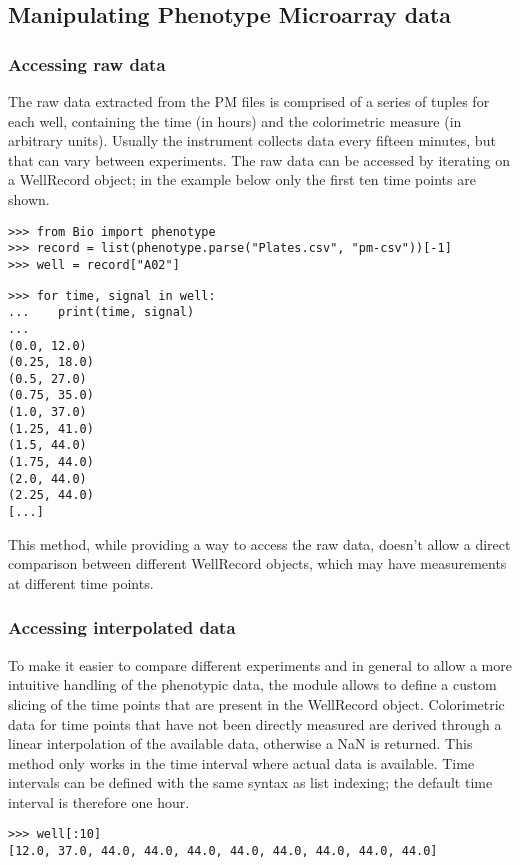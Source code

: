\subsection{Manipulating Phenotype Microarray data}

\subsubsection{Accessing raw data}
The raw data extracted from the PM files is comprised of a series of tuples for each well,
containing the time (in hours) and the colorimetric measure (in arbitrary units).
Usually the instrument collects data every fifteen minutes, but that can vary between
experiments. The raw data can be accessed by iterating on a WellRecord object;
in the example below only the first ten time points are shown.

\begin{verbatim}
>>> from Bio import phenotype
>>> record = list(phenotype.parse("Plates.csv", "pm-csv"))[-1]
>>> well = record["A02"]
\end{verbatim}
\begin{verbatim}
>>> for time, signal in well:
...    print(time, signal)
...
(0.0, 12.0)
(0.25, 18.0)
(0.5, 27.0)
(0.75, 35.0)
(1.0, 37.0)
(1.25, 41.0)
(1.5, 44.0)
(1.75, 44.0)
(2.0, 44.0)
(2.25, 44.0)
[...]
\end{verbatim}

This method, while providing a way to access the raw data, doesn't allow a direct
comparison between different WellRecord objects, which may have measurements at
different time points.

\subsubsection{Accessing interpolated data}
To make it easier to compare different experiments and in general to allow a more intuitive handling
of the phenotypic data, the module allows to define a custom slicing of the time points that are present
in the WellRecord object. Colorimetric data for time points that have not been directly measured are
derived through a linear interpolation of the available data, otherwise a NaN is returned.
This method only works in the time interval where actual data is available.
Time intervals can be defined with the same syntax as list
indexing; the default time interval is therefore one hour.

\begin{verbatim}
>>> well[:10]  
[12.0, 37.0, 44.0, 44.0, 44.0, 44.0, 44.0, 44.0, 44.0, 44.0]
\end{verbatim}

